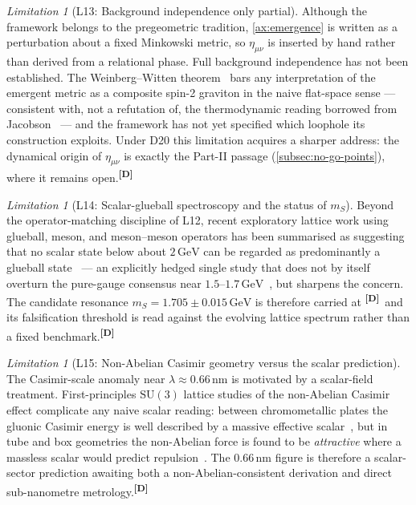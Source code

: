 \documentclass[12pt,a4paper,twoside]{article}
\theoremstyle{plain}
\theoremstyle{definition}
\theoremstyle{remark}
\newtheorem{limitation}[theorem]{Limitation}
\newcommand{\GeV}{\,\mathrm{GeV}}
\newcommand{\catmark}[1]{\textsuperscript{\textsf{\textbf{[#1]}}}}
\begin{document}
\begin{limitation}[L13: Background independence only partial]
\label{lim:L13}
Although the framework belongs to the pregeometric tradition,
\cref{ax:emergence} is written as a perturbation about a fixed Minkowski
metric, so $\eta_{\mu\nu}$ is inserted by hand rather than derived from
a relational phase. Full background independence has not been
established. The Weinberg--Witten theorem~\cite{weinbergwitten1980} bars any interpretation of the
emergent metric as a composite spin-2 graviton in the naive flat-space
sense --- consistent with, not a refutation of, the thermodynamic
reading borrowed from Jacobson~\cite{jenkins2009,carlip2014} --- and the framework has not yet
specified which loophole its construction exploits. Under D20 this
limitation acquires a sharper address: the dynamical origin of
$\eta_{\mu\nu}$ is exactly the Part-II passage
(\cref{subsec:no-go-points}), where it remains open.\catmark{D}
\end{limitation}

\begin{limitation}[L14: Scalar-glueball spectroscopy and the status of $m_S$]
\label{lim:L14}
Beyond the operator-matching discipline of L12, recent exploratory
lattice work using glueball, meson, and meson--meson operators has been
summarised as suggesting that no scalar state below about
$2\,\mathrm{GeV}$ can be regarded as predominantly a glueball state~\cite{morningstar2024} ---
an explicitly hedged single study that does not by itself overturn the
pure-gauge consensus near $1.5$--$1.7\,\mathrm{GeV}$~\cite{athenodorou2020,morningstar1999}, but sharpens the
concern. The candidate resonance $m_S = 1.705 \pm 0.015\GeV$ is
therefore carried at \catmark{D}\ and its falsification threshold is
read against the evolving lattice spectrum rather than a fixed
benchmark.\catmark{D}
\end{limitation}

\begin{limitation}[L15: Non-Abelian Casimir geometry versus the scalar prediction]
\label{lim:L15}
The Casimir-scale anomaly near $\lambda \approx 0.66\,\mathrm{nm}$ is
motivated by a scalar-field treatment. First-principles $\mathrm{SU}(3)$
lattice studies of the non-Abelian Casimir effect complicate any naive
scalar reading: between chromometallic plates the gluonic Casimir energy
is well described by a massive effective scalar~\cite{chernodub2023}, but in tube and box
geometries the non-Abelian force is found to be \emph{attractive} where
a massless scalar would predict repulsion~\cite{ngwenya2025}. The $0.66\,\mathrm{nm}$
figure is therefore a scalar-sector prediction awaiting both a
non-Abelian-consistent derivation and direct sub-nanometre metrology.\catmark{D}
\end{limitation}
\end{document}
